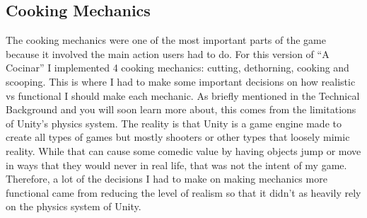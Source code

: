 \documentclass[10pt,twocolumn]{article}
\begin{document}
\subsection{Cooking Mechanics}
The cooking mechanics were one of the most important parts of the game because it involved the main action users had to do. For this version of “A Cocinar” I implemented 4 cooking mechanics: cutting, dethorning, cooking and scooping. This is where I had to make some important decisions on how realistic vs functional I should make each mechanic. As briefly mentioned in the Technical Background and you will soon learn more about, this comes from the limitations of Unity’s physics system. The reality is that Unity is a game engine made to create all types of games but mostly shooters or other types that loosely mimic reality. While that can cause some comedic value by having objects jump or move in ways that they would never in real life, that was not the intent of my game. Therefore, a lot of the decisions I had to make on making mechanics more functional came from reducing the level of realism so that it didn’t as heavily rely on the physics system of Unity.
\end{document}
